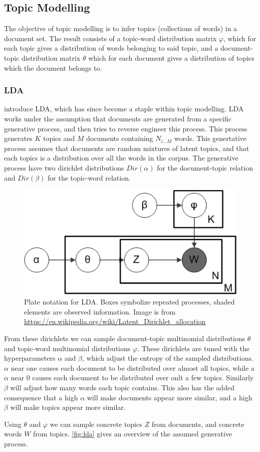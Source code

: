 \subsection{Topic Modelling}\label{subsec:topicModelling}
The objective of topic modelling is to infer topics (collections of words) in a document set.
The result consists of a topic-word distribution matrix $\varphi$, which for each topic gives a distribution of words belonging to said topic, and a document-topic distribution matrix $\theta$ which for each document gives a distribution of topics which the document belongs to.

\subsubsection{\acrlong{LDA}}\label{subsec:lda}
 introduce \gls{LDA}, which has since become a staple within topic modelling.
\gls{LDA} works under the assumption that documents are generated from a specific generative process, and then tries to reverse engineer this process.
This process generates $K$ topics and $M$ documents containing $N_{i\dots M}$ words.
This genertative process assumes that documents are random mixtures of latent topics, and that each topics is a distribution over all the words in the corpus.
The generative process have two dirichlet distributions $Dir(\alpha)$ for the document-topic relation and $Dir(\beta)$ for the topic-word relation.

\begin{figure}[h]
	\centering
	\includegraphics[width= 0.3 \textwidth]{figures/Smoothed_LDA.PNG}
	\caption{Plate notation for \gls{LDA}. Boxes symbolize repeated processes, shaded elements are observed information. Image is from \url{https://en.wikipedia.org/wiki/Latent_Dirichlet_allocation}}
	\label{fig:lda}
\end{figure}

From these dirichlets we can sample document-topic multinomial distributions $\theta$ and topic-word multinomial distributions $\varphi$.
These dirichlets are tuned with the hyperparameters $\alpha$ and $\beta$, which adjust the entropy of the sampled distributions.
$\alpha$ near one causes each document to be distributed over almost all topics, while a $\alpha$ near 0 causes each document to be distributed over onlt a few topics.
Similarly $\beta$ will adjust how many words each topic contains.
This also has the added consequence that a high $\alpha$ will make documents appear more similar, and a high $\beta$ will make topics appear more similar.

Using $\theta$ and $\varphi$ we can sample concrete topics $Z$ from documents, and concrete words $W$ from topics.
\autoref{fig:lda} gives an overview of the assumed generative process.